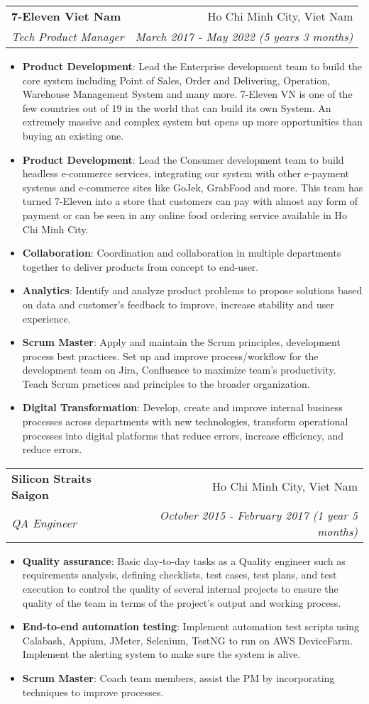\documentclass[letterpaper,11pt]{article}
\makeatletter
\newcommand{\resumeItem}[2]{
  \item\small{
    \textbf{#1}{: #2 \vspace{-2pt}}
  }
}
\newcommand{\resumeSubheading}[4]{
  \vspace{-1pt}\item
    \begin{tabular*}{0.97\textwidth}[t]{l@{\extracolsep{\fill}}r}
      \textbf{#1} & #2 \\
      \textit{\small#3} & \textit{\small #4} \\
    \end{tabular*}\vspace{-5pt}
}
\newcommand{\resumeItemListStart}{\begin{itemize}}
\newcommand{\resumeItemListEnd}{\end{itemize}\vspace{-5pt}}
\makeatother
\begin{document}
    \resumeSubheading
      {7-Eleven Viet Nam}{Ho Chi Minh City, Viet Nam}
      {Tech Product Manager}{March 2017 - May 2022 (5 years 3 months)}
      \resumeItemListStart
        \resumeItem{Product Development}
        {Lead the Enterprise development team to build the core system including Point of Sales, Order and Delivering, Operation, Warehouse Management System and many more. 7-Eleven VN is one of the few countries out of 19 in the world that can build its own System. An extremely massive and complex system but opens up more opportunities than buying an existing one.}
        \resumeItem{Product Development}
        {Lead the Consumer development team to build headless e-commerce services, integrating our system with other e-payment systems and e-commerce sites like GoJek, GrabFood and more. This team has turned 7-Eleven into a store that customers can pay with almost any form of payment or can be seen in any online food ordering service available in Ho Chi Minh City.}
        \resumeItem{Collaboration}
        {Coordination and collaboration in multiple departments together to deliver products from concept to end-user.}
        \resumeItem{Analytics}
        {Identify and analyze product problems to propose solutions based on data and customer's feedback to improve, increase stability and user experience.}
        \resumeItem{Scrum Master}
        {Apply and maintain the Scrum principles, development process best practices. Set up and improve process/workflow for the development team on Jira, Confluence to maximize team's productivity. Teach Scrum practices and principles to the broader organization.}
        \resumeItem{Digital Transformation}
        {Develop, create and improve internal business processes across departments with new technologies, transform operational processes into digital platforms that reduce errors, increase efficiency, and reduce errors.}
    \resumeItemListEnd

    \resumeSubheading
      {Silicon Straits Saigon}{Ho Chi Minh City, Viet Nam}
      {QA Engineer}{October 2015 - February 2017 (1 year 5 months)}
      \resumeItemListStart
        \resumeItem{Quality assurance}
            {Basic day-to-day tasks as a Quality engineer such as requirements analysis, defining checklists, test cases, test plans, and test execution to control the quality of several internal projects to ensure the quality of the team in terms of the project's output and working process.}
        \resumeItem{End-to-end automation testing}
            {Implement automation test scripts using Calabash, Appium, JMeter, Selenium, TestNG to run on AWS DeviceFarm. Implement the alerting system to make sure the system is alive.}
        \resumeItem{Scrum Master}
            {Coach team members, assist the PM by incorporating techniques to improve processes.}
      \resumeItemListEnd
\end{document}
